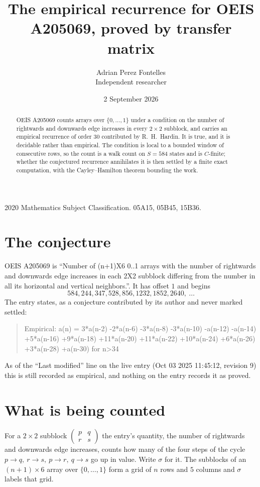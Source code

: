 \documentclass[11pt,a4paper]{article}
\title{The empirical recurrence for OEIS A205069, proved by transfer matrix}
\author{Adrian Perez Fontelles\\ \small Independent researcher}
\date{2 September 2026}
\theoremstyle{plain}
\theoremstyle{definition}
\begin{document}
\maketitle

\begin{abstract}
OEIS A205069 counts arrays over $\{0,\dots,1\}$ under a condition on the number of rightwards and downwards edge increases
in every $2\times2$ subblock, and carries an empirical recurrence of order $30$ contributed by
R.~H.~Hardin. It is true, and it is decidable rather than empirical. The condition is local to
a bounded window of consecutive rows, so the count is a walk count on $S=584$ states and is
$C$-finite; whether the conjectured recurrence annihilates it is then settled by a finite exact
computation, with the Cayley--Hamilton theorem bounding the work.
\end{abstract}

\noindent\small 2020 Mathematics Subject Classification. 05A15, 05B45, 15B36.\normalsize

\section{The conjecture}

OEIS A205069 is ``Number of (n+1)X6 0..1 arrays with the number of rightwards and downwards edge increases in each 2X2 subblock differing from the number in all its horizontal and vertical neighbors.''. It has offset $1$ and begins
\[
584, 244, 347, 528, 856, 1232, 1852, 2640,\ \dots
\]
The entry states, as a conjecture contributed by its author and never marked settled:
\begin{quote}
Empirical: a(n) = 3*a(n-2) -2*a(n-6) -3*a(n-8) -3*a(n-10) -a(n-12) -a(n-14) +5*a(n-16) +9*a(n-18) +11*a(n-20) +11*a(n-22) +10*a(n-24) +6*a(n-26) +3*a(n-28) +a(n-30) for n>34
\end{quote}
As of the ``Last modified'' line on the live entry (Oct 03 2025 11:45:12, revision 9) this is still
recorded as empirical, and nothing on the entry records it as proved.

\section{What is being counted}

For a $2\times2$ subblock $\begin{pmatrix}p&q\\r&s\end{pmatrix}$ the
entry's quantity, the number of rightwards and downwards edge increases, counts how many of the four steps of the cycle $p\to q,\ r\to s,\ p\to r,\ q\to s$ go up in value. Write $\sigma$ for it. The subblocks of an
$(n+1)\times6$ array over $\{0,\dots,1\}$ form a grid of $n$ rows and $5$
columns and $\sigma$ labels that grid.
\end{document}
